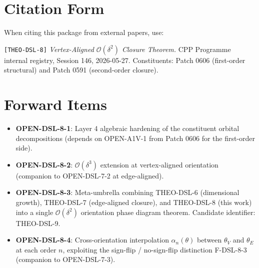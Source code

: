\documentclass[11pt]{article}
\begin{document}
\section{Citation Form}

When citing this package from external papers, use:

\medskip
\noindent\texttt{[THEO-DSL-8]} \emph{Vertex-Aligned $\mathcal{O}(\delta^2)$
Closure Theorem.} CPP Programme internal registry, Session 146,
2026-05-27. Constituents: Patch 0606 (first-order structural) and
Patch 0591 (second-order closure).

\section{Forward Items}

\begin{itemize}
\item \textbf{OPEN-DSL-8-1}: Layer 4 algebraic hardening of the
constituent orbital decompositions (depends on OPEN-A1V-1 from Patch 0606
for the first-order side).
\item \textbf{OPEN-DSL-8-2}: $\mathcal{O}(\delta^3)$ extension at
vertex-aligned orientation (companion to OPEN-DSL-7-2 at edge-aligned).
\item \textbf{OPEN-DSL-8-3}: Meta-umbrella combining THEO-DSL-6
(dimensional growth), THEO-DSL-7 (edge-aligned closure), and THEO-DSL-8
(this work) into a single $\mathcal{O}(\delta^2)$ orientation phase
diagram theorem. Candidate identifier: THEO-DSL-9.
\item \textbf{OPEN-DSL-8-4}: Cross-orientation interpolation
$\alpha_n(\theta)$ between $\theta_V$ and $\theta_E$ at each order $n$,
exploiting the sign-flip / no-sign-flip distinction F-DSL-8-3
(companion to OPEN-DSL-7-3).
\end{itemize}
\end{document}
